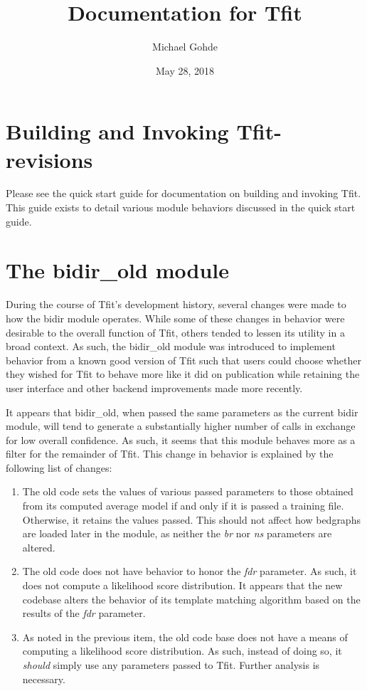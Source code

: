 \documentclass[12pt,letterpaper]{article}
\begin{document}
\title{Documentation for Tfit}
\author{Michael Gohde}
\date{May 28, 2018}
\maketitle


\tableofcontents

\section{Building and Invoking Tfit-revisions}
Please see the quick start guide for documentation on building and invoking Tfit. This guide exists to detail various module behaviors discussed in the quick start guide.

\section{The bidir\_old module}
During the course of Tfit's development history, several changes were made to how the bidir module operates. While some of these changes in behavior were desirable to the overall function of Tfit, others tended to lessen its utility in a broad context. As such, the bidir\_old module was introduced to implement behavior from a known good version of Tfit such that users could choose whether they wished for Tfit to behave more like it did on publication while retaining the user interface and other backend improvements made more recently. 

It appears that bidir\_old, when passed the same parameters as the current bidir module, will tend to generate a substantially higher number of calls in exchange for low overall confidence. As such, it seems that this module behaves more as a filter for the remainder of Tfit. This change in behavior is explained by the following list of changes:

\begin{enumerate}
\item The old code sets the values of various passed parameters to those obtained from its computed average model if and only if it is passed a training file. Otherwise, it retains the values passed. This should not affect how bedgraphs are loaded later in the module, as neither the \textit{br} nor \textit{ns} parameters are altered.
\item The old code does not have behavior to honor the \textit{fdr} parameter. As such, it does not compute a likelihood score distribution. It appears that the new codebase alters the behavior of its template matching algorithm based on the results of the \textit{fdr} parameter. 
\item As noted in the previous item, the old code base does not have a means of computing a likelihood score distribution. As such, instead of doing so, it \textit{should} simply use any parameters passed to Tfit. Further analysis is necessary.
\end{enumerate}
\end{document}
